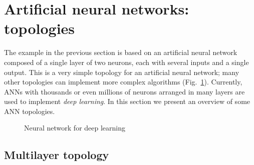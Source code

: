 \section{Artificial neural networks: topologies}\label{s.ann-topology}


The example in the previous section is based on an artificial neural network composed of a single layer of two neurons, each with several inputs and a single output. This is a very simple topology for an artificial neural network; many other topologies can implement more complex algorithms (Fig.~\ref{fig.nn-deep}). Currently, ANNs with thousands or even millions of neurons arranged in many layers are used to implement \emph{deep learning}. In this section we present an overview of some ANN topologies.

\begin{figure}
\begin{center}
\caption{Neural network for deep learning}\label{fig.nn-deep}
\end{center}
\end{figure}


\subsection{Multilayer topology}

